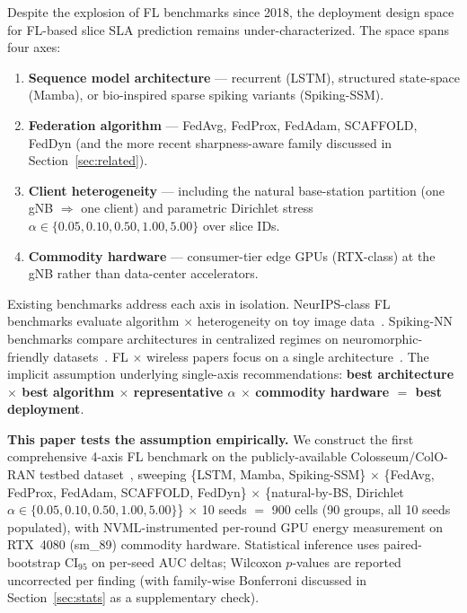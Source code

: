 \documentclass[journal]{IEEEtran}
\begin{document}
Despite the explosion of FL benchmarks since 2018, the deployment design space for FL-based slice SLA prediction remains under-characterized. The space spans four axes:
\begin{enumerate}
    \item \textbf{Sequence model architecture} --- recurrent (LSTM), structured state-space (Mamba), or bio-inspired sparse spiking variants (Spiking-SSM).
    \item \textbf{Federation algorithm} --- FedAvg, FedProx, FedAdam, SCAFFOLD, FedDyn (and the more recent sharpness-aware family discussed in Section~\ref{sec:related}).
    \item \textbf{Client heterogeneity} --- including the natural base-station partition (one gNB $\Rightarrow$ one client) and parametric Dirichlet stress $\alpha\in\{0.05, 0.10, 0.50, 1.00, 5.00\}$ over slice IDs.
    \item \textbf{Commodity hardware} --- consumer-tier edge GPUs (RTX-class) at the gNB rather than data-center accelerators.
\end{enumerate}

Existing benchmarks address each axis in isolation. NeurIPS-class FL benchmarks evaluate algorithm $\times$ heterogeneity on toy image data~\cite{Caldas2018_LEAF, Lai2022_FedScale, Song2022_FLAIR, Granqvist2024_pflresearch}. Spiking-NN benchmarks compare architectures in centralized regimes on neuromorphic-friendly datasets~\cite{Shen2025_STEP}. FL $\times$ wireless papers focus on a single architecture~\cite{FedLSTM2022, arXiv2508_08479, Mangi2026}. The implicit assumption underlying single-axis recommendations: \textbf{best architecture $\times$ best algorithm $\times$ representative $\alpha$ $\times$ commodity hardware $=$ best deployment}.

\textbf{This paper tests the assumption empirically.} We construct the first comprehensive 4-axis FL benchmark on the publicly-available Colosseum/ColO-RAN testbed dataset~\cite{Polese2022, Bonati2024}, sweeping \{LSTM, Mamba, Spiking-SSM\} $\times$ \{FedAvg, FedProx, FedAdam, SCAFFOLD, FedDyn\} $\times$ \{natural-by-BS, Dirichlet $\alpha\in\{0.05, 0.10, 0.50, 1.00, 5.00\}$\} $\times$ 10 seeds $=$ 900 cells (90 groups, all 10 seeds populated), with NVML-instrumented per-round GPU energy measurement on RTX~4080 (sm\_89) commodity hardware. Statistical inference uses paired-bootstrap CI$_{95}$ on per-seed AUC deltas; Wilcoxon $p$-values are reported uncorrected per finding (with family-wise Bonferroni discussed in Section~\ref{sec:stats} as a supplementary check).
\end{document}
